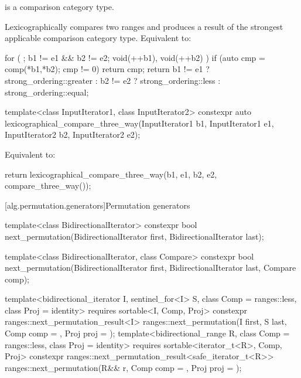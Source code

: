 \begin{itemdescr}
\pnum
\mandates
{} is a comparison category type.

\pnum
\effects
Lexicographically compares two ranges and
produces a result of the strongest applicable comparison category type.
Equivalent to:
\begin{codeblock}
for ( ; b1 != e1 && b2 != e2; void(++b1), void(++b2) )
  if (auto cmp = comp(*b1,*b2); cmp != 0)
    return cmp;
return b1 != e1 ? strong_ordering::greater :
       b2 != e2 ? strong_ordering::less :
                  strong_ordering::equal;
\end{codeblock}
\end{itemdescr}

%
\begin{itemdecl}
template<class InputIterator1, class InputIterator2>
  constexpr auto
    lexicographical_compare_three_way(InputIterator1 b1, InputIterator1 e1,
                                      InputIterator2 b2, InputIterator2 e2);
\end{itemdecl}

\begin{itemdescr}
\pnum
\effects
Equivalent to:
\begin{codeblock}
return lexicographical_compare_three_way(b1, e1, b2, e2, compare_three_way());
\end{codeblock}
\end{itemdescr}

[alg.permutation.generators]{Permutation generators}

%
\begin{itemdecl}
template<class BidirectionalIterator>
  constexpr bool next_permutation(BidirectionalIterator first,
                                  BidirectionalIterator last);

template<class BidirectionalIterator, class Compare>
  constexpr bool next_permutation(BidirectionalIterator first,
                                  BidirectionalIterator last, Compare comp);

template<bidirectional_iterator I, sentinel_for<I> S, class Comp = ranges::less,
         class Proj = identity>
  requires sortable<I, Comp, Proj>
  constexpr ranges::next_permutation_result<I>
    ranges::next_permutation(I first, S last, Comp comp = {}, Proj proj = {});
template<bidirectional_range R, class Comp = ranges::less,
         class Proj = identity>
  requires sortable<iterator_t<R>, Comp, Proj>
  constexpr ranges::next_permutation_result<safe_iterator_t<R>>
    ranges::next_permutation(R&& r, Comp comp = {}, Proj proj = {});
\end{itemdecl}

